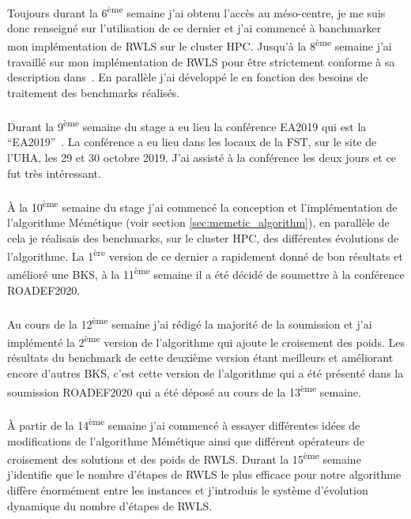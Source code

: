 \documentclass[a4paper,11pt,twoside,french,report]{../common/simplem}
\begin{document}
				\paragraph*{}
					Toujours durant la 6\textsuperscript{ème} semaine j'ai obtenu l'accès au méso-centre, je me suis donc renseigné sur l'utilisation de ce dernier et j'ai commencé à banchmarker mon implémentation de \gls{RWLS} sur le cluster \gls{HPC}. Jusqu'à la 8\textsuperscript{ème} semaine j'ai travaillé sur mon implémentation de \gls{RWLS} pour être strictement conforme à sa description dans~\cite{Gao2015}. En parallèle j'ai développé le \printer{} en fonction des besoins de traitement des benchmarks réalisés.
				\paragraph*{}
					Durant la 9\textsuperscript{ème} semaine du stage a eu lieu la conférence \acrshort{EA2019} qui est la ``\acrlong{EA2019}''~\cite{EA2019}. La conférence a eu lieu dans les locaux de la \gls{FST}, sur le site de l'\gls{UHA}, les 29 et 30 octobre 2019. J'ai assisté à la conférence les deux jours et ce fut très intéressant.
				\paragraph*{}
					À la 10\textsuperscript{ème} semaine du stage j'ai commencé la conception et l'implémentation de l'algorithme Mémétique (voir section \ref{sec:memetic_algorithm}), en parallèle de cela je réalisais des benchmarks, sur le cluster \gls{HPC}, des différentes évolutions de l'algorithme. La 1\textsuperscript{ère} version de ce dernier a rapidement donné de bon résultats et amélioré une \gls{BKS}, à la 11\textsuperscript{ème} semaine il a été décidé de soumettre à la conférence \acrshort{ROADEF2020}.
				\paragraph*{}
					Au cours de la 12\textsuperscript{ème} semaine j'ai rédigé la majorité de la soumission et j'ai implémenté la 2\textsuperscript{ème} version de l'algorithme qui ajoute le croisement des poids. Les résultats du benchmark de cette deuxième version étant meilleurs et améliorant encore d'autres \gls{BKS}, c'est cette version de l'algorithme qui a été présenté dans la soumission \acrshort{ROADEF2020} qui a été déposé au cours de la 13\textsuperscript{ème} semaine.
				\paragraph*{}
					À partir de la 14\textsuperscript{ème} semaine j'ai commencé à essayer différentes idées de modifications de l'algorithme Mémétique ainsi que différent opérateurs de croisement des solutions et des poids de \gls{RWLS}. Durant la 15\textsuperscript{ème} semaine j'identifie que le nombre d'étapes de \gls{RWLS} le plus efficace pour notre algorithme diffère énormément entre les instances et j'introduis le système d'évolution dynamique du nombre d'étapes de \gls{RWLS}.
\end{document}
